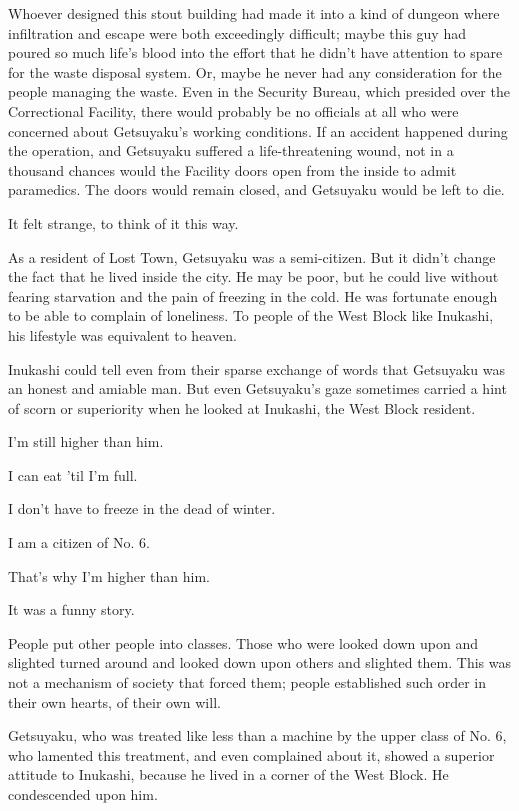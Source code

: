 Whoever designed this stout building had made it into a kind of dungeon
where infiltration and escape were both exceedingly difficult; maybe
this guy had poured so much life's blood into the effort that he didn't
have attention to spare for the waste disposal system. Or, maybe he
never had any consideration for the people managing the waste. Even in
the Security Bureau, which presided over the Correctional Facility,
there would probably be no officials at all who were concerned about
Getsuyaku's working conditions. If an accident happened during the
operation, and Getsuyaku suffered a life-threatening wound, not in a
thousand chances would the Facility doors open from the inside to admit
paramedics. The doors would remain closed, and Getsuyaku would be left
to die.

It felt strange, to think of it this way.

As a resident of Lost Town, Getsuyaku was a semi-citizen. But it didn't
change the fact that he lived inside the city. He may be poor, but he
could live without fearing starvation and the pain of freezing in the
cold. He was fortunate enough to be able to complain of loneliness. To
people of the West Block like Inukashi, his lifestyle was equivalent to
heaven.

Inukashi could tell even from their sparse exchange of words that
Getsuyaku was an honest and amiable man. But even Getsuyaku's gaze
sometimes carried a hint of scorn or superiority when he looked at
Inukashi, the West Block resident.

I'm still higher than him.

I can eat 'til I'm full.

I don't have to freeze in the dead of winter.

I am a citizen of No. 6.

That's why I'm higher than him.

It was a funny story.

People put other people into classes. Those who were looked down upon
and slighted turned around and looked down upon others and slighted
them. This was not a mechanism of society that forced them; people
established such order in their own hearts, of their own will.

Getsuyaku, who was treated like less than a machine by the upper class
of No. 6, who lamented this treatment, and even complained about it,
showed a superior attitude to Inukashi, because he lived in a corner of
the West Block. He condescended upon him.

